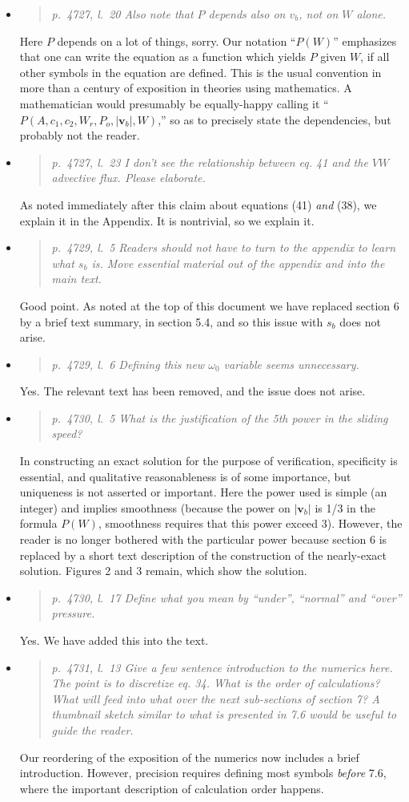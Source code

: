 \documentclass[11pt,reqno]{amsart}
\newcommand{\reply}[2]{
\medskip\medskip
\item  \begin{quote}
\emph{#1}
\end{quote}

\medskip
\noindent #2}
\begin{document}
\begin{itemize}
\reply{p.~4727, l.~20 Also note that $P$ depends also on $v_b$, not on $W$ alone.}
{Here $P$ depends on a lot of things, sorry.  Our notation ``$P(W)$'' emphasizes that one can write the equation as a function which yields $P$ given $W$, if all other symbols in the equation are defined.  This is the usual convention in more than a century of exposition in theories using mathematics.  A mathematician would presumably be equally-happy calling it ``$P(A,c_1,c_2,W_r,P_o,|\mathbf{v}_b|,W)$,'' so as to precisely state the dependencies, but probably not the reader.}

\reply{p.~4727, l.~23 I don’t see the relationship between eq. 41 and the $VW$ advective flux.  Please elaborate.}
{As noted immediately after this claim about equations (41) \emph{and} (38), we explain it in the Appendix.  It is nontrivial, so we explain it.}

\reply{p.~4729, l.~5 Readers should not have to turn to the appendix to learn what $s_b$ is. Move essential material out of the appendix and into the main text.}
{Good point.  As noted at the top of this document we have replaced section 6 by a brief text summary, in section 5.4, and so this issue with $s_b$ does not arise.}

\reply{p.~4729, l.~6 Defining this new $\omega_0$ variable seems unnecessary.}
{Yes.  The relevant text has been removed, and the issue does not arise.}

\reply{p.~4730, l.~5 What is the justification of the 5th power in the sliding speed?}
{In constructing an exact solution for the purpose of verification, specificity is essential, and qualitative reasonableness is of some importance, but uniqueness is not asserted or important.  Here the power used is simple (an integer) and implies smoothness (because the power on $|\mathbf{v}_b|$ is 1/3 in the formula $P(W)$, smoothness requires that this power exceed 3).  However, the reader is no longer bothered with the particular power because section 6 is replaced by a short text description of the construction of the nearly-exact solution.  Figures 2 and 3 remain, which show the solution.}

\reply{p.~4730, l.~17 Define what you mean by ``under'', ``normal'' and ``over'' pressure.}
{Yes.  We have added this into the text.}

\reply{p.~4731, l.~13 Give a few sentence introduction to the numerics here. The point is to
discretize eq. 34. What is the order of calculations? What will feed into what over the
next sub-sections of section 7? A thumbnail sketch similar to what is presented in 7.6
would be useful to guide the reader.}
{Our reordering of the exposition of the numerics now includes a brief introduction.  However, precision requires defining most symbols \emph{before} 7.6, where the important description of calculation order happens.}


\end{itemize}
\end{document}
